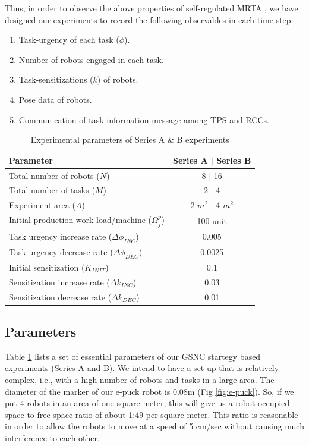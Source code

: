 \documentclass[smallcondensed]{svjour3}
\begin{document}
Thus, in order to observe the above properties of self-regulated MRTA , we have designed our experiments to record the following  observables in each time-step.
\begin{enumerate}
\item Task-urgency of each task ($\phi$).
\item Number of robots engaged in each task.
\item Task-sensitizations ($k$) of robots.
\item Pose data of robots.
\item Communication of task-information message among TPS and RCCs.  
\end{enumerate}
\begin{table}
\caption{Experimental parameters of Series A \& B experiments}
\label{table:params}
\begin{center}
\begin{tabular}{|p{2in}|c|}
\hline Parameter & Series A $\mid$ Series B\\
\hline Total number of robots ($N$) & \hspace*{0.1cm} 8 $\mid$ 16\\
\hline Total number of tasks ($M$) & 2 $\mid$ 4\\
\hline Experiment area ($A$) & 2 $m^2$ $\mid$  4 $m^2$\\
\hline Initial production work load/machine ($\Omega_{j}^{p}$) & 100 unit \\
\hline Task urgency increase rate ($\Delta\phi_{INC}$) & 0.005\\
\hline Task urgency decrease rate ($\Delta\phi_{DEC}$) & 0.0025\\
\hline Initial sensitization ($K_{INIT}$) & 0.1\\
\hline Sensitization increase rate ($\Delta k_{INC}$) & 0.03\\
\hline Sensitization decrease rate ($\Delta k_{DEC}$) & 0.01\\
\hline
\end{tabular}
\end{center}
\end{table}
\subsection{Parameters}
Table \ref{table:params} lists a set of essential parameters of our GSNC startegy based experiments (Series A and B). We intend to have a set-up that is relatively complex, i.e., with a high number of robots and tasks in a large area. The diameter of the marker of our e-puck robot is 0.08m (Fig \ref{fig:e-puck}). So, if we put 4 robots in an area of one square meter, this will give us a robot-occupied-space to free-space ratio of about 1:49 per square meter. This ratio is reasonable in order to allow the robots to move at a speed of 5 cm/sec without causing much interference to each other. 
\end{document}
